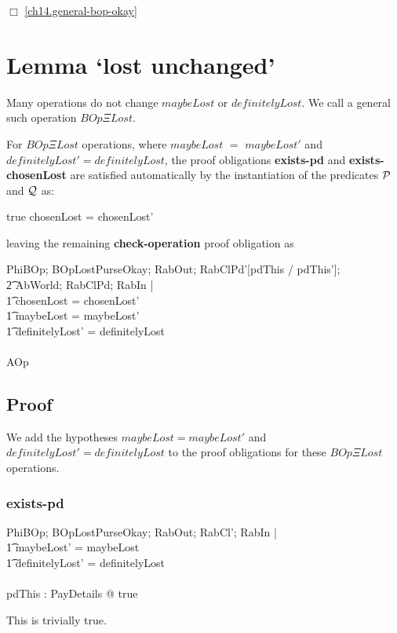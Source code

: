 $\Box$ \ref{ch14.general-bop-okay}
\section{Lemma `lost unchanged'}
\label{ch14.lost-unchanged}
Many operations do not change $maybeLost$ or $definitelyLost$.  We
call a general such operation $BOp\Xi Lost$.

  {\rm For $BOp\Xi Lost$ operations, where $maybeLost$ $=$
    $maybeLost'$ and $definitelyLost' = definitelyLost$, the proof
    obligations {\bf exists-pd} and {\bf exists-chosenLost} are
    satisfied automatically by the instantiation of the predicates
    $\mathcal{P}$ and $\mathcal{Q}$ as:
    \begin{gzed}
      \pdThisPred \iff true
      \also %
      \chosenLostPred \iff chosenLost = chosenLost'
    \end{gzed}
    leaving the remaining {\bf check-operation} proof obligation as

    \def\BOpXiLostPurseOkay{BOp\Xi LostPurseOkay}
    \begin{gzed}
      PhiBOp; \BOpXiLostPurseOkay; RabOut; RabClPd'[pdThis / pdThis'];
      \\ %
      \t2 AbWorld; RabClPd; RabIn |
      \\ %
      \t1 chosenLost = chosenLost'
      \\ %
      \t1 \land maybeLost = maybeLost'
      \\ %
      \t1 \land definitelyLost' = definitelyLost
      \\ %
      \shows
      \\ %
      AOp
    \end{gzed}
    }
\subsection{Proof}
We add the hypotheses $maybeLost = maybeLost'$ and
$definitelyLost' = definitelyLost$ to the proof
obligations for these $BOp\Xi Lost$ operations.
\subsubsection{exists-pd}
\label{ignore-maybeLost-pd}
\def\BOpXiLostPurseOkay{BOp\Xi LostPurseOkay}
\begin{gzed}
  PhiBOp; \BOpXiLostPurseOkay; RabOut; RabCl'; RabIn |
  \\ %
  \t1 maybeLost' = maybeLost
  \\ %
  \t1 \land definitelyLost' = definitelyLost
  \\ %
  \shows
  \\ %
  \exists pdThis : PayDetails @ true
\end{gzed}
This is trivially true.

